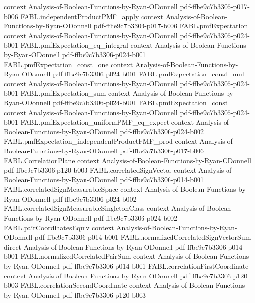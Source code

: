 \begin{theorem}
  {context}
  {Analysis-of-Boolean-Functions-by-Ryan-ODonnell}
  {pdf-ffbe9c7b3306-p017-b006}
\proofstep
  {FABL.independentProductPMF_apply}
  {context}
  {Analysis-of-Boolean-Functions-by-Ryan-ODonnell}
  {pdf-ffbe9c7b3306-p017-b006}
\proofstep
  {FABL.pmfExpectation}
  {context}
  {Analysis-of-Boolean-Functions-by-Ryan-ODonnell}
  {pdf-ffbe9c7b3306-p024-b001}
\proofstep
  {FABL.pmfExpectation_eq_integral}
  {context}
  {Analysis-of-Boolean-Functions-by-Ryan-ODonnell}
  {pdf-ffbe9c7b3306-p024-b001}
\proofstep
  {FABL.pmfExpectation_const_one}
  {context}
  {Analysis-of-Boolean-Functions-by-Ryan-ODonnell}
  {pdf-ffbe9c7b3306-p024-b001}
\proofstep
  {FABL.pmfExpectation_const_mul}
  {context}
  {Analysis-of-Boolean-Functions-by-Ryan-ODonnell}
  {pdf-ffbe9c7b3306-p024-b001}
\proofstep
  {FABL.pmfExpectation_sum}
  {context}
  {Analysis-of-Boolean-Functions-by-Ryan-ODonnell}
  {pdf-ffbe9c7b3306-p024-b001}
\proofstep
  {FABL.pmfExpectation_const}
  {context}
  {Analysis-of-Boolean-Functions-by-Ryan-ODonnell}
  {pdf-ffbe9c7b3306-p024-b001}
\proofstep
  {FABL.pmfExpectation_uniformPMF_eq_expect}
  {context}
  {Analysis-of-Boolean-Functions-by-Ryan-ODonnell}
  {pdf-ffbe9c7b3306-p024-b002}
\proofstep
  {FABL.pmfExpectation_independentProductPMF_prod}
  {context}
  {Analysis-of-Boolean-Functions-by-Ryan-ODonnell}
  {pdf-ffbe9c7b3306-p017-b006}
\proofstep
  {FABL.CorrelationPlane}
  {context}
  {Analysis-of-Boolean-Functions-by-Ryan-ODonnell}
  {pdf-ffbe9c7b3306-p120-b003}
\proofstep
  {FABL.correlatedSignVector}
  {context}
  {Analysis-of-Boolean-Functions-by-Ryan-ODonnell}
  {pdf-ffbe9c7b3306-p014-b001}
\proofstep
  {FABL.correlatedSignMeasurableSpace}
  {context}
  {Analysis-of-Boolean-Functions-by-Ryan-ODonnell}
  {pdf-ffbe9c7b3306-p024-b002}
\proofstep
  {FABL.correlatedSignMeasurableSingletonClass}
  {context}
  {Analysis-of-Boolean-Functions-by-Ryan-ODonnell}
  {pdf-ffbe9c7b3306-p024-b002}
\proofstep
  {FABL.pairCoordinatesEquiv}
  {context}
  {Analysis-of-Boolean-Functions-by-Ryan-ODonnell}
  {pdf-ffbe9c7b3306-p014-b001}
\proofstep
  {FABL.normalizedCorrelatedSignVectorSum}
  {direct}
  {Analysis-of-Boolean-Functions-by-Ryan-ODonnell}
  {pdf-ffbe9c7b3306-p014-b001}
\proofstep
  {FABL.normalizedCorrelatedPairSum}
  {context}
  {Analysis-of-Boolean-Functions-by-Ryan-ODonnell}
  {pdf-ffbe9c7b3306-p014-b001}
\proofstep
  {FABL.correlationFirstCoordinate}
  {context}
  {Analysis-of-Boolean-Functions-by-Ryan-ODonnell}
  {pdf-ffbe9c7b3306-p120-b003}
\proofstep
  {FABL.correlationSecondCoordinate}
  {context}
  {Analysis-of-Boolean-Functions-by-Ryan-ODonnell}
  {pdf-ffbe9c7b3306-p120-b003}

\end{theorem}
